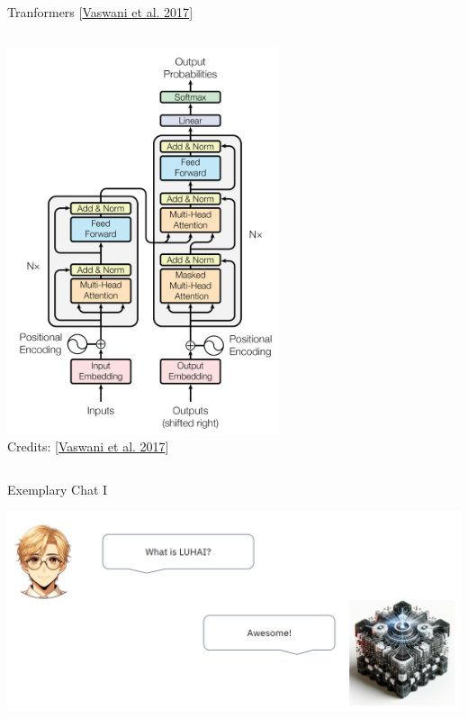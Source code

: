 \documentclass[aspectratio=169]{../latex_main/tntbeamer}  %
\begin{document}
\begin{frame}{Tranformers [\href{https://arxiv.org/pdf/1706.03762}{Vaswani et al. 2017}]}
\begin{columns}
\begin{column}{0.5\textwidth}
        \centering
        \vspace*{-2em}
        \includegraphics[width=0.6\textwidth]{figure/transformer.png}\\
        Credits: [\href{https://arxiv.org/pdf/1706.03762}{Vaswani et al. 2017}]

        \end{column}
            
        \end{columns}
        
        \end{frame}

        \begin{frame}{Exemplary Chat I}

            \centering
            \includegraphics[width=1\linewidth]{figure/transformer1.png}
        
        \end{frame}
\end{document}
